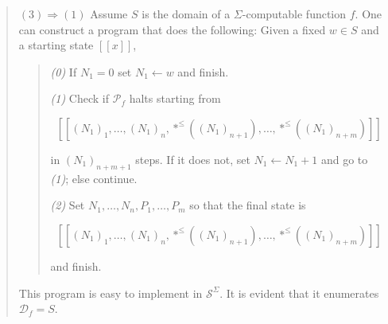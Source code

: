 \documentclass[a4paper, 12pt]{article}
\begin{document}
\begin{quote}
    $(3) \Rightarrow (1)$ Assume $S$ is the domain of a $\Sigma$-computable
    function $f$. One can construct a program that does the following: Given a
    fixed $w \in S$ and a starting state $[\![ x ]\!]$,

    \begin{quote}
        \textit{(0)} If $N_1 = 0$ set $N_1 \leftarrow  w$ and finish.

        \textit{(1)} Check if $\mathcal{P}_f$ halts starting from 

        $$[\![ (N_1)_1,
        \ldots, (N_1)_{n}, *^{\leq} \left( (N_1)_{n+1} \right), \ldots, *^{\leq}
        \left( (N_1)_{n+m} \right) ]\!]$$

        in $(N_1)_{n+m+1}$ steps. If it does not, set $N_1 \leftarrow  N_1 + 1$
        and go to \textit{(1)}; else continue. 

        \textit{(2)} Set $N_1, \ldots, N_n, P_1, \ldots, P_m$ so that the final
        state is 

        $$[\![ (N_1)_1,
        \ldots, (N_1)_{n}, *^{\leq} \left( (N_1)_{n+1} \right), \ldots, *^{\leq}
        \left( (N_1)_{n+m} \right) ]\!]$$

        and finish.
    \end{quote}

    This program is easy to implement in $\mathcal{S}^{\Sigma}$. It is evident
    that it enumerates $\mathcal{D}_f = S$.

\end{quote}
\normalsize
\end{document}
